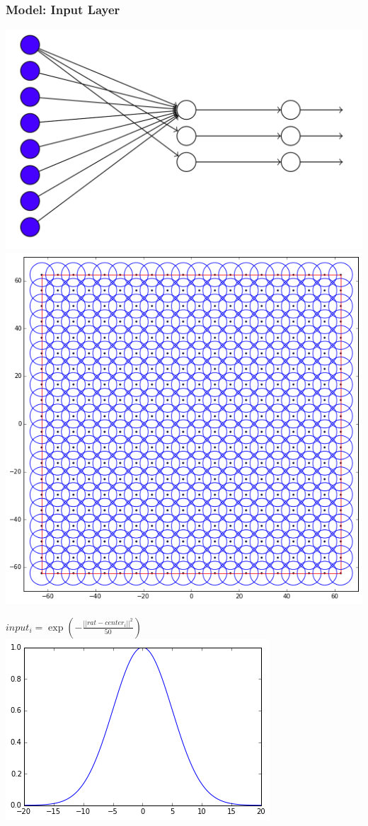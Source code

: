 \begin{frame}
\frametitle{Model: Input Layer}
\begin{multicols}{2}
\begin{center}
\includegraphics[scale=.1]{pics/model_input}
\vskip 2mm
\includegraphics[scale=.15]{pics/place_cell_locations}
\end{center}
\columnbreak
\begin{center}
$input_i = \exp(-\frac{||rat - center_i||^2}{50})$
\vskip 20mm
\includegraphics[scale=.3]{pics/gauss}
\end{center}
\end{multicols}
\end{frame}

